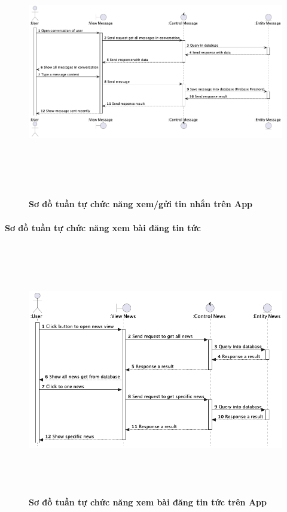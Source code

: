   \begin{figure}[H]
        \centering
        \includegraphics[width=16cm,height=11cm]{Images/mobile_app/send_and_receive_message.png}
        \caption[Sơ đồ tuần tự chức năng xem/gửi tin nhắn trên App]{\bfseries \fontsize{12pt}{0pt}
        \selectfont Sơ đồ tuần tự chức năng xem/gửi tin nhắn trên App}
        \label{hinh21} %
  \end{figure}


\paragraph{Sơ đồ tuần tự chức năng xem bài đăng tin tức}
\mbox{}

  \begin{figure}[H]
        \centering
        \includegraphics[width=16cm,height=11cm]{Images/mobile_app/view_news.png}
        \caption[ Sơ đồ tuần tự chức năng xem bài đăng tin tứctrên App]{\bfseries \fontsize{12pt}{0pt}
        \selectfont Sơ đồ tuần tự chức năng xem bài đăng tin tức trên App}
        \label{hinh21} %
  \end{figure}

